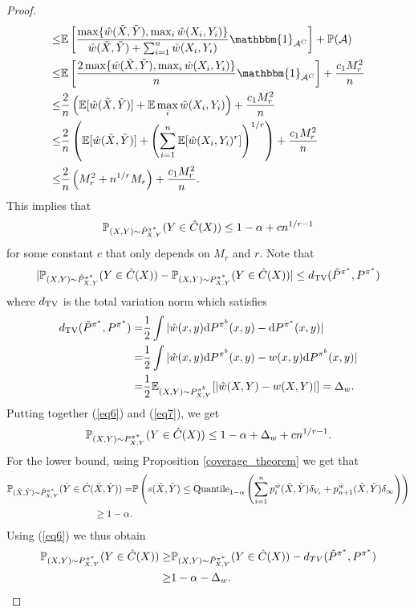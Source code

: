 \begin{proof}
\begin{align}
    \leq& \E\left[ \frac{\max \{\hat{w}(\tilde{X}, \tilde{Y}), \max_i \hat{w}(X_i, Y_i) \}}{\hat{w}(\tilde{X}, \tilde{Y}) + \sum_{i=1}^n \hat{w}(X_i, Y_i) } \mathbbm{1}_{\mathcal{A}^C} \right] + \mathbb{P}(\mathcal{A}) \nonumber \\
    \leq& \E\left[ \frac{2\max \{\hat{w}(\tilde{X}, \tilde{Y}), \max_i \hat{w}(X_i, Y_i) \}}{n} \mathbbm{1}_{\mathcal{A}^C} \right] + \frac{c_1 M_r^2}{n} \nonumber \\
    \leq& \frac{2}{n} \left( \E[\hat{w}(\tilde{X}, \tilde{Y})] + \E \max_i \hat{w}(X_i, Y_i) 
    \right) + \frac{c_1 M_r^2}{n} \nonumber \\
    \leq& \frac{2}{n}\left( \E[\hat{w}(\tilde{X}, \tilde{Y})] + \left(\sum_{i=1}^n \E[\hat{w}(X_i, Y_i)^r]\right)^{1/r}\right) + \frac{c_1 M_r^2}{n} \nonumber \\
    \leq& \frac{2}{n}\left(M_r^2 + n^{1/r}M_r \right) + \frac{c_1 M_r^2}{n}.  \nonumber
\end{align} 
This implies that 
\[
\mathbb{P}_{(X,Y)\sim \tilde{P}^{\pi^*}_{X,Y}}(Y \in \hat{C}(X)) \leq 1-\alpha + cn^{1/r-1}
\]
for some constant $c$ that only depends on $M_r$ and $r$.
Note that 
\begin{align}
    | \mathbb{P}_{(X,Y)\sim \tilde{P}^{\pi^*}_{X,Y}}(Y \in \hat{C}(X)) - \mathbb{P}_{(X,Y)\sim P^{\pi^*}_{X,Y}}(Y \in \hat{C}(X)) | \leq d_{\textup{TV}}(\tilde{P}^{\pi^*}, P^{\pi^*})  \label{eq6}
\end{align}
where $d_{\textup{TV}}$ is the total variation norm which satisfies
\begin{align}
    d_{\textup{TV}}(\tilde{P}^{\pi^*}, P^{\pi^*}) =& \frac{1}{2} \int | \hat{w}(x,y)\mathrm{d}P^{\pi^b}(x,y) - \mathrm{d}P^{\pi^*}(x,y) | \nonumber \\
    =& \frac{1}{2} \int | \hat{w}(x,y)\mathrm{d}P^{\pi^b}(x,y) - w(x,y) \mathrm{d}P^{\pi^b}(x,y) | \nonumber\\
    =& \frac{1}{2} \mathbb{E}_{(X,Y)\sim P^{\pi^b}_{X,Y}}[|\hat{w}(X,Y) - w(X,Y) |] = \Delta_w. \label{eq7}
\end{align}
Putting together (\ref{eq6}) and (\ref{eq7}), we get
\begin{align}
    \mathbb{P}_{(X,Y)\sim P^{\pi^*}_{X,Y}}(Y \in \hat{C}(X)) \leq 1-\alpha + \Delta_w + cn^{1/r-1}.
\end{align}
For the lower bound, using Proposition \ref{coverage_theorem} we get that 
\begin{align}
    \mathbb{P}_{(\tilde{X}, \tilde{Y}) \sim \tilde{P}^{\pi^*}_{X,Y}}(\tilde{Y} \in \hat{C}(\tilde{X}, \tilde{Y})) =& \mathbb{P}\left(s(\tilde{X}, \tilde{Y}) \leq \text{Quantile}_{1-\alpha}\left(\sum_{i=1}^n p_i^{\hat{w}}(\tilde{X}, \tilde{Y})\delta_{V_i} + p_{n+1}^{\hat{w}}(\tilde{X}, \tilde{Y})\delta_\infty \right)\right) \nonumber\\
    \geq 1-\alpha.
\end{align}
Using (\ref{eq6}) we thus obtain 
\begin{align}
    \mathbb{P}_{(X,Y)\sim P^{\pi^*}_{X,Y}}(Y \in \hat{C}(X)) \geq& \mathbb{P}_{(X,Y)\sim \tilde{P}^{\pi^*}_{X,Y}}(Y \in \hat{C}(X)) - d_{TV}(\tilde{P}^{\pi^*}, P^{\pi^*}) \nonumber \\
    \geq& 1-\alpha - \Delta_w.
\end{align}
\end{proof}

